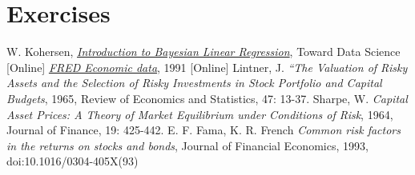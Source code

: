 \section*{Exercises}


\begin{thebibliography}{9}
W. Kohersen, \href{https://towardsdatascience.com/introduction-to-bayesian-linear-regression-e66e60791ea7}{\emph{Introduction to Bayesian Linear Regression}}, Toward Data Science [Online]
\href{https://fred.stlouisfed.org/}{\emph{FRED Economic data}}, 1991 [Online]
 Lintner, J. \emph{“The Valuation of Risky Assets and the Selection of Risky Investments in Stock Portfolio and Capital Budgets}, 1965, Review of Economics and
Statistics, 47: 13-37.
 Sharpe, W. \emph{Capital Asset Prices: A Theory of Market Equilibrium under Conditions of Risk}, 1964, Journal of Finance, 19: 425-442.
 E. F. Fama, K. R. French \emph{Common risk factors in the returns on stocks and bonds}, Journal of Financial Economics, 1993, doi:10.1016/0304-405X(93)
\end{thebibliography}



